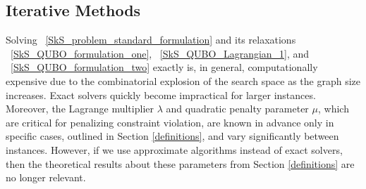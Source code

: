 \documentclass{article}
\begin{document}






\subsection{Iterative Methods}

Solving ~\eqref{SkS_problem_standard_formulation} and its relaxations ~\eqref{SkS_QUBO_formulation_one}, ~\eqref{SkS_QUBO_Lagrangian_1}, and ~\eqref{SkS_QUBO_formulation_two} exactly is, in general, computationally expensive due to the combinatorial explosion of the search space as the graph size increases. Exact solvers quickly become impractical for larger instances. Moreover, the Lagrange multiplier $\lambda$ and quadratic penalty parameter $\mu$, which are critical for penalizing constraint violation, are known in advance only in specific cases, outlined in Section \ref{definitions}, and vary significantly between instances. However, if we use approximate algorithms instead of exact solvers, then the theoretical results about these parameters from Section \ref{definitions} are no longer relevant.
\end{document}
